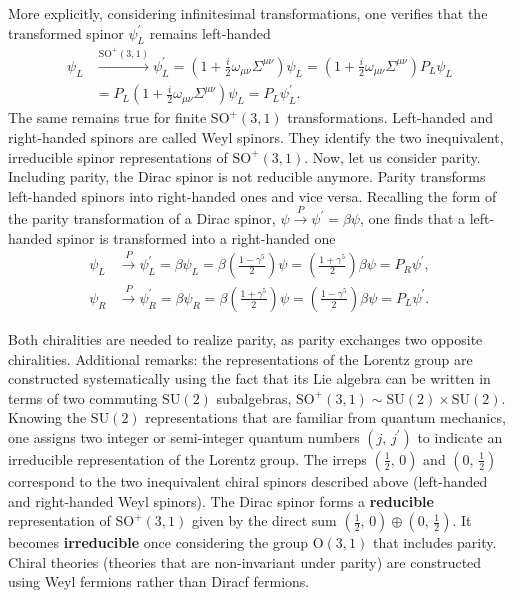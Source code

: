 More explicitly, considering infinitesimal transformations, one verifies that the transformed spinor \(\psi_L^{\prime}\) remains left-handed
\[
    \begin{aligned}
        \psi_L & \xrightarrow{\mathrm{SO}^+(3,1)} \psi_L^{\prime} = \left(1 + \frac{i}{2} \omega_{\mu \nu}\Sigma^{\mu \nu}\right) \psi_L = \left(1 + \frac{i}{2} \omega_{\mu \nu}\Sigma^{\mu \nu}\right) P_L \psi_L \\
               & = P_L \left(1 + \frac{i}{2} \omega_{\mu \nu}\Sigma^{\mu \nu}\right) \psi_L = P_L \psi_L^{\prime}.
    \end{aligned}
\]
The same remains true for finite \(\mathrm{SO}^+(3,1)\) transformations. Left-handed and right-handed spinors are called Weyl spinors. They identify the two inequivalent, irreducible spinor representations of \(\mathrm{SO}^+(3,1)\).
Now, let us consider parity. Including parity, the Dirac spinor is not reducible anymore. Parity transforms left-handed spinors into right-handed ones and vice versa. Recalling the form of the parity transformation of a Dirac spinor, \(\psi\xrightarrow{P}\psi^{\prime}=\beta \psi\), one finds that a left-handed spinor is transformed into a right-handed one
\[
    \begin{aligned}
        \psi_L & \xrightarrow{P} \psi_L^{\prime} = \beta \psi_L = \beta \left(\frac{1 - \gamma^5}{2}\right) \psi = \left(\frac{1 + \gamma^5}{2}\right) \beta \psi = P_R \psi^{\prime}, \\
        \psi_R & \xrightarrow{P} \psi_R^{\prime} = \beta \psi_R = \beta \left(\frac{1 + \gamma^5}{2}\right) \psi = \left(\frac{1 - \gamma^5}{2}\right) \beta \psi = P_L \psi^{\prime}.
    \end{aligned}
\]

Both chiralities are needed to realize parity, as parity exchanges two opposite chiralities. Additional remarks: the representations of the Lorentz group are constructed systematically using the fact that its Lie algebra can be written in terms of two commuting \(\mathrm{SU}(2)\) subalgebras, \(\mathrm{SO}^+(3,1) \sim  \mathrm{SU}(2) \times \mathrm{SU}(2)\). Knowing the \(\mathrm{SU}(2)\) representations that are familiar from quantum mechanics, one assigns two integer or semi-integer quantum numbers \((j,\,j^{\prime})\) to indicate an irreducible representation of the Lorentz group. The irreps \((\tfrac12,\,0)\) and \((0,\,\tfrac12)\) correspond to the two inequivalent chiral spinors described above (left-handed and right-handed Weyl spinors). The Dirac spinor forms a \textbf{reducible} representation of \(\mathrm{SO}^+(3,1)\) given by the direct sum \((\tfrac12,\,0) \oplus (0,\,\tfrac12)\). It becomes \textbf{irreducible} once considering the group \(\mathrm{O}(3,1)\) that includes parity. Chiral theories (theories that are non-invariant under parity) are constructed using Weyl fermions rather than Diracf fermions.

